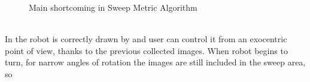 \begin{figure}[!htp]
\begin{center}
    \hspace*{15pt}

    \vspace*{1pt}
  \end{center}
  \caption{Main shortcoming in Sweep Metric Algorithm}
  \label{fig:ASM_explain}
\end{figure}
\\
In  the robot is correctly drawn by \framework{}
and user can control it from an exocentric point of view, thanks to
the previous collected images. When robot begins to turn, for narrow
angles of rotation the images are still included in the sweep area, so
